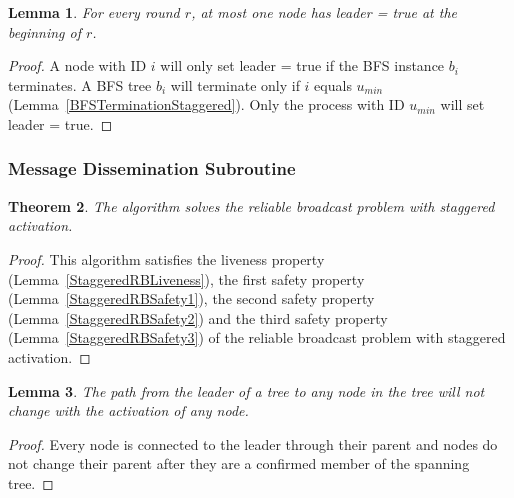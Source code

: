 \documentclass[english]{article}
\newtheorem{theorem}{Theorem}[section]
\newtheorem{lemma}[theorem]{Lemma}
\begin{document}
\begin{lemma}
\label{LESafetyStaggered}
For every round $r$, at most one node has leader = true at the beginning of $r$.
\end{lemma}
\begin{proof}
A node with ID $i$ will only set leader = true if the BFS instance $b_i$ terminates.
A BFS tree $b_i$ will terminate only if $i$ equals $u_{min}$ (Lemma~\ref{BFSTerminationStaggered}).
Only the process with ID $u_{min}$ will set leader = true. 
\end{proof}


\subsubsection{Message Dissemination Subroutine}

\begin{theorem}
\label{StaggeredReliableBroadcast}
  The algorithm solves the reliable broadcast problem with staggered activation.
\end{theorem}
\begin{proof}
This algorithm satisfies the liveness property (Lemma~\ref{StaggeredRBLiveness}), 
the first safety property (Lemma~\ref{StaggeredRBSafety1}),
the second safety property (Lemma~\ref{StaggeredRBSafety2}) and 
the third safety property (Lemma~\ref{StaggeredRBSafety3}) of the reliable broadcast problem with staggered activation.
\end{proof}

\begin{lemma}
\label{StaggeredStablePath}
The path from the leader of a tree to any node in the tree will not change with the activation of any node.
\end{lemma}
\begin{proof}
Every node is connected to the leader through their parent and nodes do not change their parent after they are a confirmed member of the spanning tree.
\end{proof}
\end{document}
